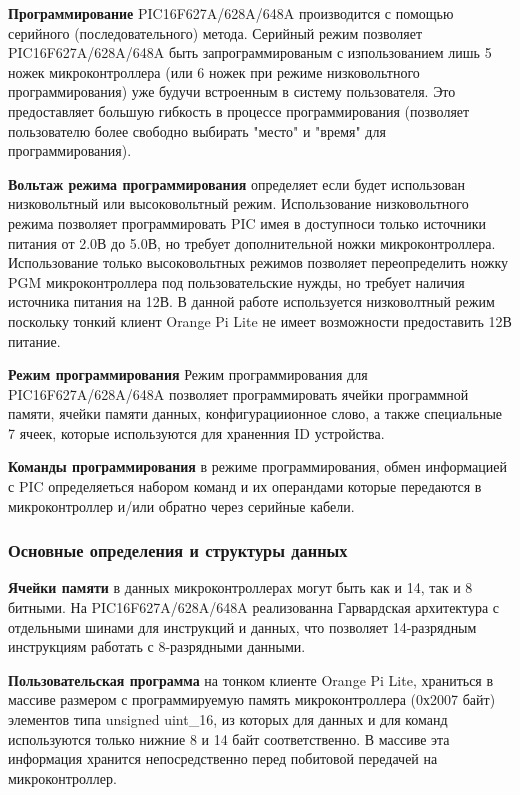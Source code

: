 \textbf{Программирование}
PIC16F627A/628A/648A производится с помощью
серийного (последовательного) метода. Серийный режим позволяет
PIC16F627A/628A/648A быть запрограммированым с изпользованием лишь 5 ножек микроконтроллера (или 6 ножек при режиме низковольтного программирования) уже будучи встроенным
в систему пользователя. Это предоставляет большую гибкость в процессе программирования 
(позволяет пользователю более свободно выбирать "место" и "время" для программирования).

\textbf{Вольтаж режима программирования}
определяет если будет использован низковольтный или высоковольтный режим. Использование низковольтного режима позволяет программировать PIC имея в доступноси только источники питания от 2.0В до 5.0В, но требует дополнительной ножки микроконтроллера. Использование только высоковольтных режимов позволяет переопределить ножку PGM микроконтроллера под пользовательские нужды, но требует наличия источника питания на 12В. В данной работе используется низковолтный режим поскольку тонкий клиент Orange Pi Lite не имеет возможности предоставить 12В питание.

\textbf{Режим программирования}
Режим программирования для PIC16F627A/628A/648A позволяет программировать ячейки
 программной памяти, ячейки памяти данных, конфигурациионное слово, а также специальные 7 ячеек, которые используются для храненния ID устройства.

\textbf{Команды программирования} 
в режиме программирования, обмен информацией с PIC определяеться набором команд и  их операндами которые передаются в микроконтроллер и/или обратно через серийные кабели.



\subsubsection{Основные определения и структуры данных}

\textbf{Ячейки памяти}
в данных микроконтроллерах могут быть как и 14, так и 8 битными. 
На PIC16F627A/628A/648A реализованна Гарвардская
архитектура с отдельными шинами для инструкций и данных, что позволяет 
14-разрядным инструкциям работать с 8-разрядными данными.

\textbf{Пользовательская программа} на тонком клиенте Orange Pi Lite, 
храниться в массиве размером с программируемую память микроконтроллера 
(0х2007 байт) элементов типа unsigned uint_16, из которых для 
данных и для команд используются только нижние 8 и 14 байт 
соответственно. В массиве эта информация хранится непосредственно 
перед побитовой передачей на микроконтроллер.

